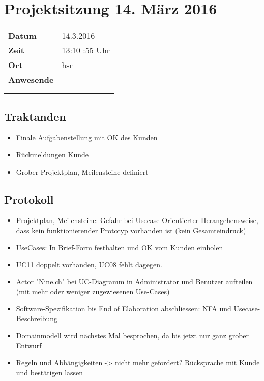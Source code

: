 \documentclass[class=scrbook,crop=false]{standalone}
\begin{document}
	
	\section*{Projektsitzung 14. März 2016}
	
	\begin{tabular}{ll}
		\textbf{Datum} & 14.3.2016 \\
		\textbf{Zeit} & 13:10 \textendash 13:55 Uhr \\
		\textbf{Ort} & \acs{hsr} \\
		\textbf{Anwesende} & \proff \\ & \ubos \\ & \pchr
	\end{tabular}
	
	\subsection*{Traktanden}
	
	\begin{itemize}
		\item Finale Aufgabenstellung mit OK des Kunden
        \item Rückmeldungen Kunde
        \item Grober Projektplan, Meilensteine definiert
	\end{itemize}
	
	\subsection*{Protokoll}
	
	\begin{itemize}
		\item Projektplan, Meilensteine: Gefahr bei Usecase-Orientierter Herangehensweise, dass kein funktionierender Prototyp vorhanden ist (kein Gesamteindruck)
		\item UseCases: In Brief-Form festhalten und OK vom Kunden einholen
		\item UC11 doppelt vorhanden, UC08 fehlt dagegen.
		\item Actor "Nine.ch" bei UC-Diagramm in Administrator und Benutzer aufteilen (mit mehr oder weniger zugewiesenen Use-Cases)
		\item Software-Spezifikation bis End of Elaboration abschliessen: NFA und Usecase-Beschreibung
		\item Domainmodell wird nächstes Mal besprochen, da bis jetzt nur ganz grober Entwurf
		\item Regeln und Abhängigkeiten -> nicht mehr gefordert? Rücksprache mit Kunde und bestätigen lassen
	\end{itemize}
	
\end{document}
